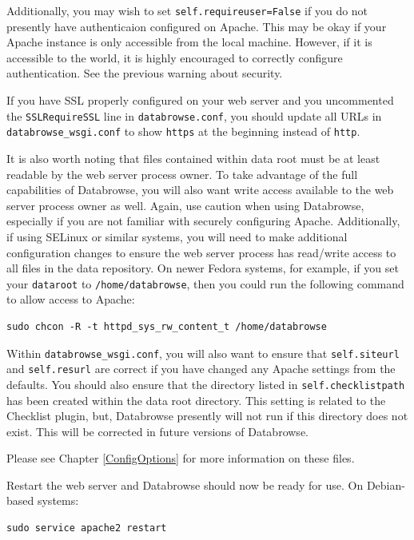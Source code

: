 \documentclass[10pt]{article}
\begin{document}
Additionally, you may wish to set \texttt{self.requireuser=False} if you do not presently have authenticaion configured on Apache.  This may be okay if your Apache instance is only accessible from the local machine.  However, if it is accessible to the world, it is highly encouraged to correctly configure authentication.  See the previous warning about security.

If you have SSL properly configured on your web server and you uncommented the \texttt{SSLRequireSSL} line in \texttt{databrowse.conf}, you should update all URLs in \texttt{databrowse\_wsgi.conf} to show \texttt{https} at the beginning instead of \texttt{http}.

It is also worth noting that files contained within data root must be at least readable by the web server process owner.  To take advantage of the full capabilities of Databrowse, you will also want write access available to the web server process owner as well.  Again, use caution when using Databrowse, especially if you are not familiar with securely configuring Apache.  Additionally, if using SELinux or similar systems, you will need to make additional configuration changes to ensure the web server process has read/write access to all files in the data repository.  On newer Fedora systems, for example, if you set your \texttt{dataroot} to \texttt{/home/databrowse}, then you could run the following command to allow access to Apache:

\begin{verbatim}
sudo chcon -R -t httpd_sys_rw_content_t /home/databrowse
\end{verbatim}

Within \texttt{databrowse\_wsgi.conf}, you will also want to ensure that \texttt{self.siteurl} and \texttt{self.resurl} are correct if you have changed any Apache settings from the defaults.  You should also ensure that the directory listed in \texttt{self.checklistpath} has been created within the data root directory.  This setting is related to the Checklist plugin, but, Databrowse presently will not run if this directory does not exist.  This will be corrected in future versions of Databrowse.

Please see Chapter \ref{ConfigOptions} for more information on these files.

Restart the web server and Databrowse should now be ready for use.  On Debian-based systems:

\begin{verbatim}
sudo service apache2 restart
\end{verbatim}
\end{document}
